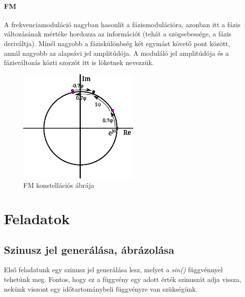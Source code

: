 \documentclass[12pt,a4paper]{article}
\begin{document}
\paragraph{FM}
A frekvenciamoduláció nagyban hasonlít a fázismodulációra, azonban itt a fázis változásának mértéke hordozza az információt (tehát a szögsebessége, a fázis deriváltja). Minél nagyobb a fáziskülönbség két egymást követő pont között, annál nagyobb az alapsávi jel amplitúdója. A moduláló jel amplitúdója és a fázisváltozás közti szorzót itt is löketnek nevezzük.
\begin{figure}[H]
\begin{center}
\includegraphics[width=6cm]{figures/modulaciok_workshop_konst_fm_2.eps}
\caption{FM konstellációs ábrája}
\label{fig:konstfm}
\end{center}
\end{figure}

\clearpage
\section{Feladatok}

\subsection{Szinusz jel generálása, ábrázolása}
Első feladatunk egy szinusz jel generálása lesz, melyet a \textit{sin()} függvénnyel tehetünk meg. Fontos, hogy ez a függvény egy adott érték szinuszát adja vissza, nekünk viszont egy időtartománybeli függvényre van szükségünk. 
\end{document}
